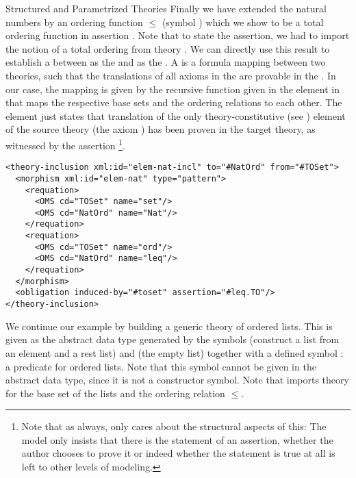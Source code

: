 \begin{omgroup}[id=natlist]{Structured and Parametrized Theories}
Finally we have extended the natural numbers by an ordering function $\leq$ (symbol
{}) which we show to be a total ordering function in assertion
{}.  Note that to state the assertion, we had to import the notion of a
total ordering from theory {}. We can directly use this result to establish
a {} between {} as the
{} and {} as the {}. A
{} is a formula mapping between two theories, such that the
translations of all axioms in the {} are provable in the
{}. In our case, the mapping is given by the recursive function
given in the {} element in {} that maps the respective
base sets and the ordering relations to each other. The {} element
just states that translation of the only theory-constitutive
(see ) element of the source theory (the axiom
{}) has been proven in the target theory, as witnessed
by the assertion {}\footnote{Note that as always,
  {\omdoc} only cares about the structural aspects of this: The
  {\omdoc} model only insists that there is the statement of an
  assertion, whether the author chooses to prove it or indeed whether
  the statement is true at all is left to other levels of modeling.}.

\begin{lstlisting}[mathescape,label=lst:nat-ti,
  index={theory,symbol,definition,assertion}]
<theory-inclusion xml:id="elem-nat-incl" to="#NatOrd" from="#TOSet">
  <morphism xml:id="elem-nat" type="pattern">
    <requation>
      <OMS cd="TOSet" name="set"/>
      <OMS cd="NatOrd" name="Nat"/>
    </requation>
    <requation>
      <OMS cd="TOSet" name="ord"/>
      <OMS cd="NatOrd" name="leq"/>
    </requation>
  </morphism>
  <obligation induced-by="#toset" assertion="#leq.TO"/>
</theory-inclusion>
\end{lstlisting}

We continue our example by building a generic theory {} of ordered lists.
This is given as the abstract data type generated by the symbols {}
(construct a list from an element and a rest list) and {} (the empty list)
together with a defined symbol {}: a predicate for ordered lists. Note
that this symbol cannot be given in the abstract data type, since it is not a constructor
symbol. Note that {} imports theory {} for the base set of
the lists and the ordering relation $\leq$.


\end{omgroup}
